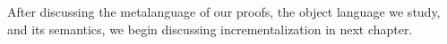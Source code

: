 




After discussing the metalanguage of our proofs, the object
language we study, and its semantics, we begin discussing
incrementalization in next chapter.
